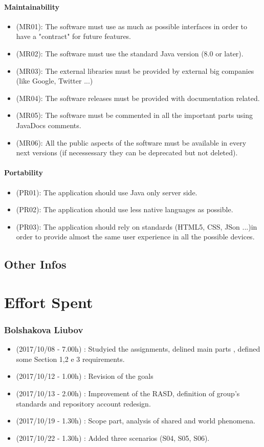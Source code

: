 \documentclass[a4paper,leqno]{book}
\begin{document}
\subsection{Maintainability}
\begin{itemize}
\item (MR01): The software must use as much as possible interfaces in order to have a "contract" for future features.
\item (MR02): The software must use the standard Java version (8.0 or later).
\item (MR03): The external libraries must be provided by external big companies (like Google, Twitter ...)
\item (MR04): The software releases must be provided with documentation related.
\item (MR05): The software must be commented in all the important parts using JavaDocs comments.
\item (MR06): All the public aspects of the software must be available in every next versions (if necessessary they can be deprecated but not deleted).
\end{itemize}

\subsection{Portability}
\begin{itemize}
\item (PR01): The application should use Java only server side.
\item (PR02): The application should use less native languages as possible.
\item (PR03): The application should rely on standards (HTML5, CSS, JSon ...)in order to provide almost the same user experience in all the possible devices.
\end{itemize}

\chapter{Other Infos}

\part{Effort Spent}

\section{Bolshakova Liubov}
\begin{itemize}
\item (2017/10/08 - 7.00h) : Studyied the assignments, delined main parts , defined some Section 1,2 e 3 requirements.
\item (2017/10/12 - 1.00h) : Revision of the goals 
\item (2017/10/13 - 2.00h) : Improvement of the RASD, definition of group's standards and repository account redesign.
\item (2017/10/19 - 1.30h) : Scope part, analysis of shared and world phenomena.
\item (2017/10/22 - 1.30h) : Added three scenarios (S04, S05, S06).
\end{itemize}
\end{document}
